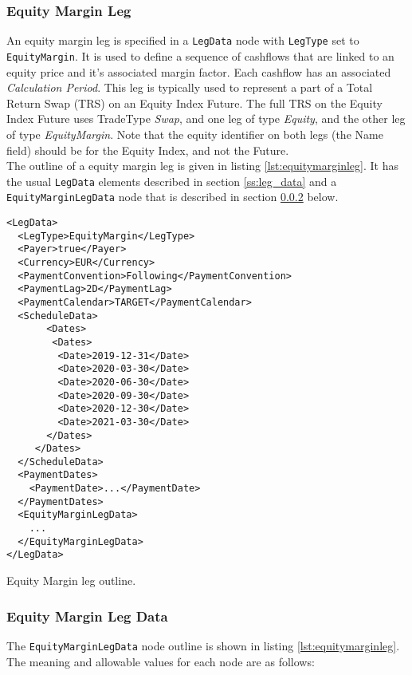 \subsubsection{Equity Margin Leg}
\label{ss:equitymarginleg}

An equity margin leg is specified in a \lstinline!LegData! node with \lstinline!LegType! set to \lstinline!EquityMargin!. It is used to define a sequence of cashflows that are linked to an equity price and it's associated margin factor. Each cashflow has an associated \textit{Calculation Period}. This leg is typically used to represent a part of a Total Return Swap (TRS) on an Equity Index Future. The full TRS on the Equity Index Future uses TradeType \emph{Swap}, and one leg of type \emph{Equity}, and the other leg of type \emph{EquityMargin}. Note that the equity identifier on both legs (the Name field) should be for the Equity Index, and not the Future. \\
\medskip
The outline of a equity margin leg is given in listing \ref{lst:equitymarginleg}. It has the usual \lstinline!LegData! elements described in section \ref{ss:leg_data} and a \lstinline!EquityMarginLegData! node that is described in section \ref{ss:equity_margin_leg_data} below.

\begin{listing}[h!]
\begin{verbatim}
<LegData>
  <LegType>EquityMargin</LegType>
  <Payer>true</Payer>
  <Currency>EUR</Currency>
  <PaymentConvention>Following</PaymentConvention>
  <PaymentLag>2D</PaymentLag>
  <PaymentCalendar>TARGET</PaymentCalendar>
  <ScheduleData>
       <Dates>
        <Dates>
         <Date>2019-12-31</Date>
         <Date>2020-03-30</Date>
         <Date>2020-06-30</Date>
         <Date>2020-09-30</Date>
         <Date>2020-12-30</Date>
         <Date>2021-03-30</Date>
       </Dates>
     </Dates>
  </ScheduleData>
  <PaymentDates>
    <PaymentDate>...</PaymentDate>
  </PaymentDates>
  <EquityMarginLegData>
    ...
  </EquityMarginLegData>
</LegData>
\end{verbatim}
\caption{Equity Margin leg outline.}
\label{lst:equitymarginleg}
\end{listing}

\subsubsection{Equity Margin Leg Data}
\label{ss:equity_margin_leg_data}
The \lstinline!EquityMarginLegData! node outline is shown in listing \ref{lst:equitymarginleg}. The meaning and allowable values for each node are as follows:

